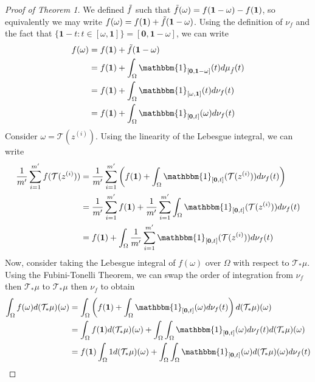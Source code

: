\documentclass{article}
\begin{document}
\begin{proof}[Proof of Theorem 1]
    We defined $\Tilde{f}$ such that $\Tilde{f}(\omega) = f(\mathbf{1} - \omega) - f(\mathbf{1})$, so equivalently we may write $f(\omega) = f(\mathbf{1}) + \Tilde{f}(\mathbf{1} - \omega)$. Using the definition of $\nu_f$ and the fact that $\{ \mathbf{1} - t: t \in [\omega, \mathbf{1}] \} = [\mathbf{0}, \mathbf{1} - \omega]$, we can write
    \begin{align*}
        f(\omega) & = f(\mathbf{1}) + \Tilde{f}(\mathbf{1} - \omega) \\ 
        & = f(\mathbf{1}) + \int_{\Omega} \mathbbm{1}_{[\mathbf{0}, \mathbf{1} - \omega]}(t) d\mu_{\Tilde{f}}(t) \\
        & = f(\mathbf{1}) + \int_{\Omega} \mathbbm{1}_{[\omega, \mathbf{1}]}(t) d\nu_f (t) \\ 
        & = f(\mathbf{1}) + \int_{\Omega} \mathbbm{1}_{[\mathbf{0}, t]}(\omega) d\nu_f (t)
    \end{align*}
    Consider $\omega = \mathcal{T}(z^{(i)})$. Using the linearity of the Lebesgue integral, we can write
    \begin{align*}
        \frac{1}{m'} \sum_{i=1}^{m'} f(\mathcal{T}(z^{(i)})) & = \frac{1}{m'} \sum_{i=1}^{m'} \left(f(\mathbf{1}) + \int_{\Omega} \mathbbm{1}_{[\mathbf{0}, t]}(\mathcal{T}(z^{(i)})) d\nu_f (t) \right) \\
        & = \frac{1}{m'} \sum_{i=1}^{m'} f(\mathbf{1}) + \frac{1}{m'} \sum_{i=1}^{m'} \int_{\Omega} \mathbbm{1}_{[\mathbf{0}, t]}(\mathcal{T}(z^{(i)})) d\nu_f (t) \\ 
        & = f(\mathbf{1}) + \int_{\Omega} \frac{1}{m'} \sum_{i=1}^{m'} \mathbbm{1}_{[\mathbf{0}, t]}(\mathcal{T}(z^{(i)})) d\nu_f (t)
    \end{align*}
    Now, consider taking the Lebesgue integral of $f(\omega)$ over $\Omega$ with respect to $\mathcal{T}_{*}\mu$. Using the Fubini-Tonelli Theorem, we can swap the order of integration from $\nu_f$ then $\mathcal{T}_{*}\mu$ to $\mathcal{T}_{*}\mu$ then $\nu_f$ to obtain
    \begin{align*}
        \int_{\Omega} f(\omega) d(\mathcal{T}_{*}\mu)(\omega) & = \int_{\Omega} \left( f(\mathbf{1}) + \int_{\Omega} \mathbbm{1}_{[\mathbf{0}, t]}(\omega) d\nu_f (t) \right) d(\mathcal{T}_{*}\mu)(\omega) \\
        & = \int_{\Omega} f(\mathbf{1}) d(\mathcal{T}_{*}\mu)(\omega) + \int_{\Omega} \int_{\Omega} \mathbbm{1}_{[\mathbf{0}, t]}(\omega) d\nu_f (t) d(\mathcal{T}_{*}\mu)(\omega) \\ 
        & = f(\mathbf{1}) \int_{\Omega} 1 d(\mathcal{T}_{*}\mu)(\omega) + \int_{\Omega} \int_{\Omega} \mathbbm{1}_{[\mathbf{0}, t]}(\omega) d(\mathcal{T}_{*}\mu)(\omega) d\nu_f (t) \\

\end{align*}
\end{proof}
\end{document}
